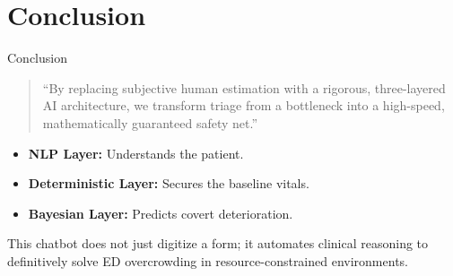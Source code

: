 \documentclass[11pt, aspectratio=169]{beamer}
\begin{document}
	\section{Conclusion}
	\begin{frame}{Conclusion}
		\begin{quote}
			``By replacing subjective human estimation with a rigorous, three-layered AI architecture, we transform triage from a bottleneck into a high-speed, mathematically guaranteed safety net.''
		\end{quote}
		\vspace{0.4cm}
		\begin{itemize}
			\item \textbf{NLP Layer:} Understands the patient.
			\item \textbf{Deterministic Layer:} Secures the baseline vitals.
			\item \textbf{Bayesian Layer:} Predicts covert deterioration. 
		\end{itemize}
		\vspace{0.2cm}
		This chatbot does not just digitize a form; it automates clinical reasoning to definitively solve ED overcrowding in resource-constrained environments.
	\end{frame}
	
\end{document}
